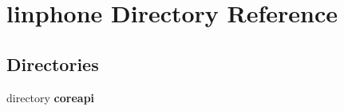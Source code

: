 \section{linphone Directory Reference}
\label{dir_6475a0f3dba4c2df76d6a840d883c67e}
\subsection*{Directories}
\begin{DoxyCompactItemize}
\item 
directory {\bf coreapi}
\end{DoxyCompactItemize}
